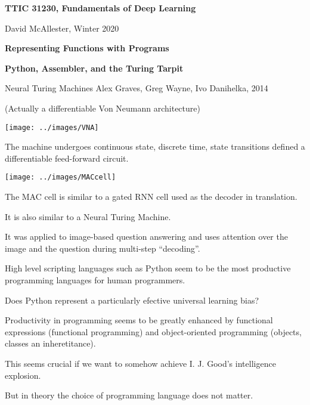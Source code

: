 




{\Huge

  \centerline{\bf TTIC 31230, Fundamentals of Deep Learning}
  \bigskip
  \centerline{David McAllester, Winter 2020}

  \vfill
  \centerline{\bf Representing Functions with Programs}
  \vfill
  \centerline{\bf Python, Assembler, and the Turing Tarpit}

  \vfill
  \vfill


Neural Turing Machines
Alex Graves, Greg Wayne, Ivo Danihelka, 2014

\vfill
(Actually a differentiable Von Neumann architecture)

\vfill
\centerline{\texttt{[image: ../images/VNA]}}

\vfill
The machine undergoes continuous state, discrete time, state transitions defined a differentiable feed-forward circuit.


\centerline{\texttt{[image: ../images/MACcell]}}

The MAC cell is similar to a gated RNN cell used as the decoder in translation.

\vfill
It is also similar to a Neural Turing Machine.

\vfill
It was applied to image-based question answering and uses attention over the image and the question during multi-step ``decoding''.


High level scripting languages such as Python seem to be the most productive programming languages for human programmers.

\vfill
Does Python represent a particularly efective universal learning bias?

\vfill
Productivity in programming seems to be greatly enhanced by functional expressions (functional programming) and object-oriented programming
(objects, classes an inheretitance).

\vfill
This seems crucial if we want to somehow achieve I. J. Good's intelligence explosion.


But in theory the choice of programming language does not matter.

}
